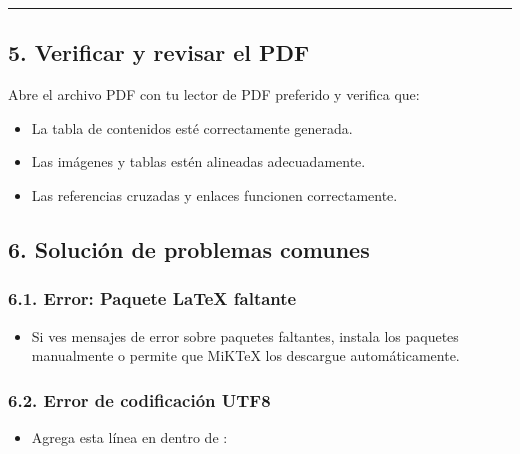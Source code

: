 \documentclass[a4paper,10pt,oneside,spanish,openany]{sphinxmanual}
\begin{document}
\sphinxAtStartPar
{}


\bigskip\hrule\bigskip



\subsection{5. Verificar y revisar el PDF}
\label{\detokenize{configuracion_inicial/009.Generar_PDF:verificar-y-revisar-el-pdf}}
\sphinxAtStartPar
Abre el archivo PDF con tu lector de PDF preferido y verifica que:
\begin{itemize}
\item {} 
\sphinxAtStartPar
La tabla de contenidos esté correctamente generada.

\item {} 
\sphinxAtStartPar
Las imágenes y tablas estén alineadas adecuadamente.

\item {} 
\sphinxAtStartPar
Las referencias cruzadas y enlaces funcionen correctamente.

\end{itemize}


\subsection{6. Solución de problemas comunes}
\label{\detokenize{configuracion_inicial/009.Generar_PDF:solucion-de-problemas-comunes}}

\subsubsection{6.1. Error: Paquete LaTeX faltante}
\label{\detokenize{configuracion_inicial/009.Generar_PDF:error-paquete-latex-faltante}}\begin{itemize}
\item {} 
\sphinxAtStartPar
Si ves mensajes de error sobre paquetes faltantes, instala los paquetes manualmente o permite que MiKTeX los descargue automáticamente.

\end{itemize}


\subsubsection{6.2. Error de codificación UTF\sphinxhyphen{}8}
\label{\detokenize{configuracion_inicial/009.Generar_PDF:error-de-codificacion-utf-8}}\begin{itemize}
\item {} 
\sphinxAtStartPar
Agrega esta línea en  dentro de :

\begin{sphinxVerbatim}[commandchars=\\\{\}]
  
\end{sphinxVerbatim}

\end{itemize}
\end{document}
